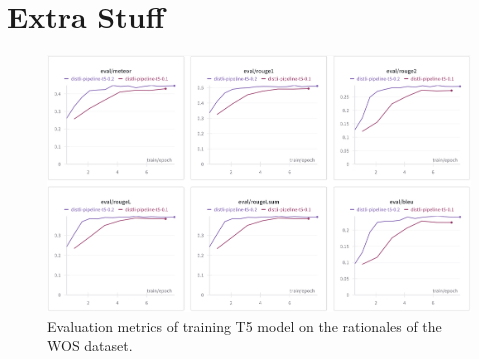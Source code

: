 \appendix
\renewcommand{\chaptername}{Appendix}
\chapter{Extra Stuff}

\begin{figure}[hbt]
    \centering
    \includegraphics[width=\linewidth]{figs/t5_metrics_wos.png}
    \caption{Evaluation metrics of training T5 model on the rationales of the WOS dataset.}
    \label{fig:t5_metrics_wos}
\end{figure}
